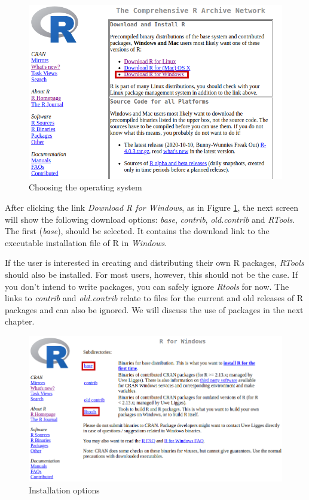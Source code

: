 \documentclass[
  12pt,
]{book}
\begin{document}
\begin{figure}[!htbp]

{\centering \includegraphics[width=1\linewidth]{figs/website_cran_3} 

}

\caption{Choosing the operating system}\label{fig:website-cran-3}
\end{figure}

After clicking the link \emph{Download R for Windows}, as in Figure \ref{fig:website-cran-3}, the next screen will show the following download options: \emph{base}, \emph{contrib}, \emph{old.contrib} and \emph{RTools}. The first (\emph{base}), should be selected. It contains the download link to the executable installation file of R in \emph{Windows}.

If the user is interested in creating and distributing their own R packages, \emph{RTools} should also be installed. For most users, however, this should not be the case. If you don't intend to write packages, you can safely ignore \emph{Rtools} for now. The links to \emph{contrib} and \emph{old.contrib} relate to files for the current and old releases of R packages and can also be ignored. We will discuss the use of packages in the next chapter.

\begin{figure}[!htbp]

{\centering \includegraphics[width=1\linewidth]{figs/website_cran_4} 

}

\caption{Installation options}\label{fig:website-cran-4}
\end{figure}
\end{document}
